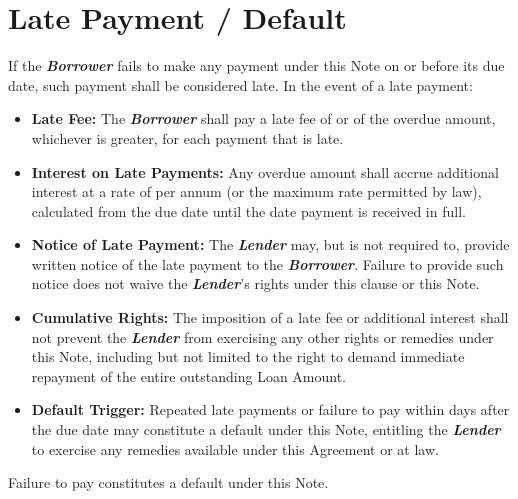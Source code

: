 
\section{Late Payment / Default}
\label{sec:late}

If the \textbf{\textit{Borrower}} fails to make any payment under this Note on or before its due date, such payment shall be considered late. In the event of a late payment:

\begin{itemize}
  \item \textbf{Late Fee:} The \textbf{\textit{Borrower}} shall pay a late fee of \LoanLateFee{} or \LoanLateFeeInterest{} of the overdue amount, whichever is greater, for each payment that is late.
  \item \textbf{Interest on Late Payments:} Any overdue amount shall accrue additional interest at a rate of \LoanLateFeeInterest{} per annum (or the maximum rate permitted by law), calculated from the due date until the date payment is received in full.
  \item \textbf{Notice of Late Payment:} The \textbf{\textit{Lender}} may, but is not required to, provide written notice of the late payment to the \textbf{\textit{Borrower}}. Failure to provide such notice does not waive the \textbf{\textit{Lender}}’s rights under this clause or this Note.
  \item \textbf{Cumulative Rights:} The imposition of a late fee or additional interest shall not prevent the \textbf{\textit{Lender}} from exercising any other rights or remedies under this Note, including but not limited to the right to demand immediate repayment of the entire outstanding Loan Amount.
  \item \textbf{ Default Trigger:} Repeated late payments or failure to pay within \LoanRepaymentDeadline{} days after the due date may constitute a default under this Note, entitling the \textbf{\textit{Lender}} to exercise any remedies available under this Agreement or at law.
\end{itemize}

\noindent Failure to pay constitutes a default under this Note.

